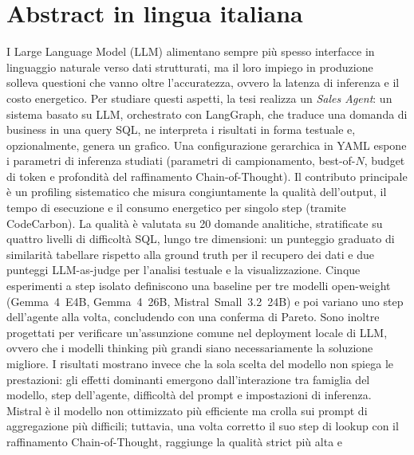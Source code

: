 \cleardoublepage

\section*{Abstract in lingua italiana}
I Large Language Model (LLM) alimentano sempre più spesso interfacce in linguaggio naturale
verso dati strutturati, ma il loro impiego in produzione solleva questioni che vanno oltre
l'accuratezza, ovvero la latenza di inferenza e il costo energetico. Per studiare questi
aspetti, la tesi realizza un \textit{Sales Agent}: un sistema basato su LLM, orchestrato con
LangGraph, che traduce una domanda di business in una query SQL, ne interpreta i risultati in
forma testuale e, opzionalmente, genera un grafico. Una
configurazione gerarchica in YAML espone i parametri di inferenza studiati
(parametri di campionamento, best-of-$N$, budget di token e profondità del raffinamento
Chain-of-Thought). Il contributo
principale è un profiling sistematico che misura congiuntamente la qualità dell'output, il tempo
di esecuzione e il consumo energetico per singolo step (tramite CodeCarbon). La qualità è
valutata su 20 domande analitiche, stratificate su quattro livelli di difficoltà SQL, lungo tre
dimensioni: un punteggio graduato di similarità tabellare rispetto alla ground truth per il recupero dei dati e due
punteggi LLM-as-judge per l'analisi testuale e la visualizzazione. Cinque esperimenti a step
isolato definiscono una baseline per tre modelli open-weight (Gemma~4~E4B, Gemma~4~26B,
Mistral~Small~3.2~24B) e poi variano uno step dell'agente alla volta, concludendo con una
conferma di Pareto. Sono inoltre progettati per verificare un'assunzione comune nel deployment
locale di LLM, ovvero che i modelli thinking più grandi siano necessariamente la soluzione
migliore. I risultati mostrano invece che la sola scelta del modello non spiega le prestazioni: gli
effetti dominanti emergono dall'interazione tra famiglia del modello, step dell'agente,
difficoltà del prompt e impostazioni di inferenza. Mistral è il modello non ottimizzato più
efficiente ma crolla sui prompt di aggregazione più difficili; tuttavia, una volta corretto il
suo step di lookup con il raffinamento Chain-of-Thought, raggiunge la qualità strict più alta e
